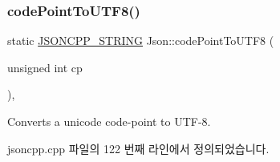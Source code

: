 \subsubsection{\texorpdfstring{code\+Point\+To\+U\+T\+F8()}{codePointToUTF8()}}
{\footnotesize\ttfamily static \hyperlink{json_8h_a1e723f95759de062585bc4a8fd3fa4be}{J\+S\+O\+N\+C\+P\+P\+\_\+\+S\+T\+R\+I\+NG} Json\+::code\+Point\+To\+U\+T\+F8 (\begin{DoxyParamCaption}\item[{unsigned int}]{cp }\end{DoxyParamCaption})\hspace{0.3cm}{\ttfamily [inline]}, {\ttfamily [static]}}



Converts a unicode code-\/point to U\+T\+F-\/8. 



jsoncpp.\+cpp 파일의 122 번째 라인에서 정의되었습니다.


